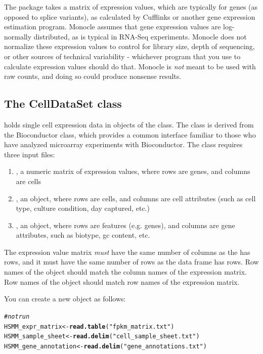 \documentclass[10pt,oneside]{article}\usepackage[]{graphicx}\usepackage[]{color}
\makeatletter
\newcommand{\hlstr}[1]{\textcolor[rgb]{0.192,0.494,0.8}{#1}}%
\newcommand{\hlcom}[1]{\textcolor[rgb]{0.678,0.584,0.686}{\textit{#1}}}%
\newcommand{\hlstd}[1]{\textcolor[rgb]{0.345,0.345,0.345}{#1}}%
\newcommand{\hlkwb}[1]{\textcolor[rgb]{0.69,0.353,0.396}{#1}}%
\newcommand{\hlkwd}[1]{\textcolor[rgb]{0.737,0.353,0.396}{\textbf{#1}}}%
\newenvironment{kframe}{%
 \def\at@end@of@kframe{}%
 \ifinner\ifhmode%
  \def\at@end@of@kframe{\end{minipage}}%
  \begin{minipage}{\columnwidth}%
 \fi\fi%
 \def\FrameCommand##1{\hskip\@totalleftmargin \hskip-\fboxsep
 \colorbox{shadecolor}{##1}\hskip-\fboxsep
     \hskip-\linewidth \hskip-\@totalleftmargin \hskip\columnwidth}%
 \MakeFramed {\advance\hsize-\width
   \@totalleftmargin\z@ \linewidth\hsize
   \@setminipage}}%
 {\par\unskip\endMakeFramed%
 \at@end@of@kframe}
\newenvironment{knitrout}{}{} %
\makeatother
\begin{document}
The  package takes a matrix of expression values, which are typically for genes (as opposed to splice variants), as calculated by Cufflinks\cite{Trapnell:2012kp} or another gene expression estimation program. Monocle assumes that gene expression values are log-normally distributed, as is typical in RNA-Seq experiments. Monocle does not normalize these expression values to control for library size, depth of sequencing, or other sources of technical variability - whichever program that you use to calculate expression values should do that.  Monocle is \emph{not} meant to be used with raw counts, and doing so could produce nonsense results.   

\subsection{The CellDataSet class}

 holds single cell expression data in objects of the  class. The class is derived from the Bioconductor  class, which provides a common interface familiar to those who have analyzed microarray experiments with Bioconductor. The class requires three input files:
\begin{enumerate}
  \item {}, a numeric matrix of expression values, where rows are genes, and columns are cells
  \item {}, an  object, where rows are cells, and columns are cell attributes (such as cell type, culture condition, day captured, etc.)
  \item {}, an  object, where rows are features (e.g. genes), and columns are gene attributes, such as biotype, gc content, etc.
\end{enumerate}

The expression value matrix \emph{must} have the same number of columns as the  has rows, and it must have the same number of rows as the  data frame has rows. Row names of the  object should match the column names of the expression matrix. Row names of the  object should match row names of the expression matrix.

You can create a new  object as follows:  

\begin{knitrout}
\color{fgcolor}\begin{kframe}
\begin{alltt}
\hlcom{#not run}
\hlstd{HSMM_expr_matrix} \hlkwb{<-} \hlkwd{read.table}\hlstd{(}\hlstr{"fpkm_matrix.txt"}\hlstd{)}
\hlstd{HSMM_sample_sheet} \hlkwb{<-} \hlkwd{read.delim}\hlstd{(}\hlstr{"cell_sample_sheet.txt"}\hlstd{)}
\hlstd{HSMM_gene_annotation} \hlkwb{<-} \hlkwd{read.delim}\hlstd{(}\hlstr{"gene_annotations.txt"}\hlstd{)}
\end{alltt}
\end{kframe}
\end{knitrout}
\end{document}
